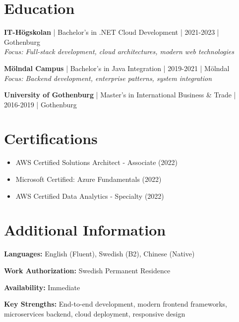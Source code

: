\documentclass[11pt,a4paper]{article}
\begin{document}
\section*{Education}

\textbf{IT-Högskolan} | Bachelor's in .NET Cloud Development | 2021-2023 | Gothenburg\\
\textit{Focus: Full-stack development, cloud architectures, modern web technologies}

\textbf{Mölndal Campus} | Bachelor's in Java Integration | 2019-2021 | Mölndal\\
\textit{Focus: Backend development, enterprise patterns, system integration}

\textbf{University of Gothenburg} | Master's in International Business \& Trade | 2016-2019 | Gothenburg

\section*{Certifications}

\begin{itemize}[leftmargin=*, itemsep=2pt]
\item AWS Certified Solutions Architect - Associate (2022)
\item Microsoft Certified: Azure Fundamentals (2022)
\item AWS Certified Data Analytics - Specialty (2022)
\end{itemize}

\section*{Additional Information}

\textbf{Languages:} English (Fluent), Swedish (B2), Chinese (Native)

\textbf{Work Authorization:} Swedish Permanent Residence

\textbf{Availability:} Immediate

\textbf{Key Strengths:} End-to-end development, modern frontend frameworks, microservices backend, cloud deployment, responsive design
\end{document}
